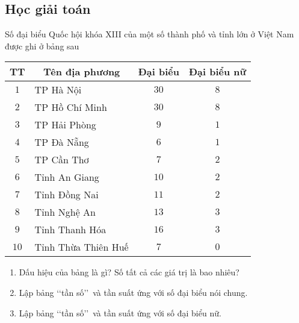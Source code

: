 \subsection{Học giải toán}
\begin{vd}%
	Số đại biểu Quốc hội khóa XIII của một số thành phố và tỉnh lớn ở Việt Nam được ghi ở bảng sau
	\begin{center}
		\begin{tabular}{|c|l|c|c|}
			\hline
			TT &\multicolumn{1}{c|}{Tên địa phương} &Đại biểu &Đại biểu nữ\\
			\hline
			$1$ &TP Hà Nội &$30$ &$8$\\
			\hline
			$2$ &TP Hồ Chí Minh &$30$ &$8$\\
			\hline
			$3$ &TP Hải Phòng &$9$ &$1$\\
			\hline
			$4$ &TP Đà Nẵng &$6$ &$1$\\
			\hline
			$5$ &TP Cần Thơ &$7$ &$2$\\
			\hline
			$6$ &Tỉnh An Giang &$10$ &$2$\\
			\hline
			$7$ &Tỉnh Đồng Nai &$11$ &$2$\\
			\hline
			$8$ &Tỉnh Nghệ An &$13$ &$3$\\
			\hline
			$9$ &Tỉnh Thanh Hóa &$16$ &$3$\\
			\hline
			$10$ &Tỉnh Thừa Thiên Huế &$7$ &$0$\\
			\hline
		\end{tabular}
	\end{center}
	\begin{enumerate}
		\item Dấu hiệu của bảng là gì? Số tất cả các giá trị là bao nhiêu?
		\item Lập bảng \lq\lq tần số\rq\rq\ và tần suất ứng với số đại biểu nói chung.
		\item Lập bảng \lq\lq tần số\rq\rq\ và tần suất ứng với số đại biểu nữ.
	\end{enumerate}
\end{vd}
